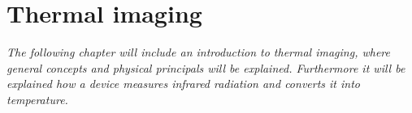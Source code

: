 \chapter{Thermal imaging}

\textit{The following chapter will include an introduction to thermal imaging, where general concepts and physical principals will be explained. Furthermore it will be explained how a device measures infrared radiation and converts it into temperature.}